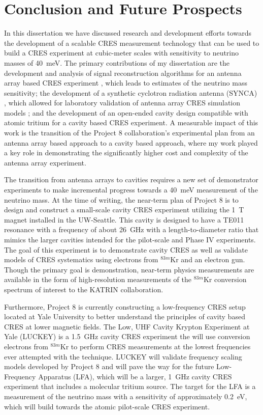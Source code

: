 
\chapter{Conclusion and Future Prospects}

In this dissertation we have discussed research and development efforts towards the development of a scalable CRES measurement technology that can be used to build a CRES experiment at cubic-meter scales with sensitivity to neutrino masses of 40~meV. The primary contributions of my dissertation are the development and analysis of signal reconstruction algorithms for an antenna array based CRES experiment \cite{p8phase3trigger}, which leads to estimates of the neutrino mass sensitivity; the development of a synthetic cyclotron radiation antenna (SYNCA) \cite{p8synca}, which allowed for laboratory validation of antenna array CRES simulation models \cite{p8jugaad}; and the development of an open-ended cavity design compatible with atomic tritium for a cavity based CRES experiment. A measurable impact of this work is the transition of the Project 8 collaboration's experimental plan from an antenna array based approach to a cavity based approach, where my work played a key role in demonstrating the significantly higher cost and complexity of the antenna array experiment.

The transition from antenna arrays to cavities requires a new set of demonstrator experiments to make incremental progress towards a 40~meV measurement of the neutrino mass. At the time of writing, the near-term plan of Project 8 is to design and construct a small-scale cavity CRES experiment utilizing the 1~T magnet installed in the UW-Seattle. This cavity is designed to have a TE011 resonance with a frequency of about 26~GHz with a length-to-diameter ratio that mimics the larger cavities intended for the pilot-scale and Phase IV experiments. The goal of this experiment is to demonstrate cavity CRES as well as validate models of CRES systematics using electrons from $^{83m}$Kr and an electron gun. Though the primary goal is demonstration, near-term physics measurements are available in the form of high-resolution measurements of the $^{83m}$Kr conversion spectrum of interest to the KATRIN collaboration.

Furthermore, Project 8 is currently constructing a low-frequency CRES setup located at Yale University to better understand the principles of cavity based CRES at lower magnetic fields. The Low, UHF Cavity Krypton Experiment at Yale (LUCKEY) is a 1.5~GHz cavity CRES experiment the will use conversion electrons from $^{83m}$Kr to perform CRES measurements at the lowest frequencies ever attempted with the technique. LUCKEY will validate frequency scaling models developed by Project 8 and will pave the way for the future Low-Frequency Apparatus (LFA), which will be a larger, 1~GHz cavity CRES experiment that includes a molecular tritium source. The target for the LFA is a measurement of the neutrino mass with a sensitivity of approximately 0.2~eV, which will build towards the atomic pilot-scale CRES experiment.

